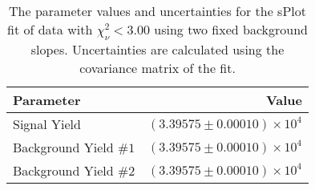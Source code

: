 
\begin{table}[ht]
    \begin{center}
        \begin{tabular}{lr}\toprule
            Parameter & Value \\\midrule
            Signal Yield & $(3.39575 \pm 0.00010) \times 10^{4}$ \\
            Background Yield $\#1$ & $(3.39575 \pm 0.00010) \times 10^{4}$ \\
            Background Yield $\#2$ & $(3.39575 \pm 0.00010) \times 10^{4}$ \\\bottomrule
        \end{tabular}
        \caption{The parameter values and uncertainties for the sPlot fit of data with $\chi^2_\nu < 3.00$ using two fixed background slopes. Uncertainties are calculated using the covariance matrix of the fit.}\label{tab:splot-fit-results-chisqdof-3.00-fixed-2}
    \end{center}
\end{table}
